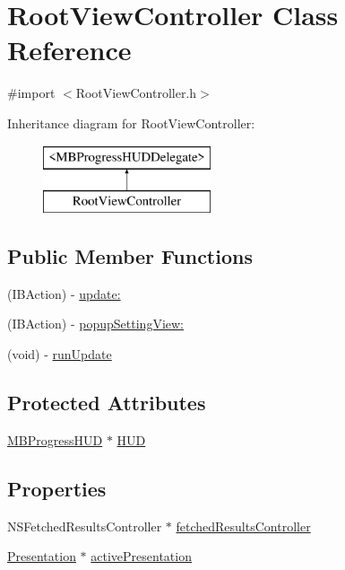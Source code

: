 \hypertarget{interface_root_view_controller}{
\section{RootViewController Class Reference}
\label{interface_root_view_controller}
}


{\ttfamily \#import $<$RootViewController.h$>$}

Inheritance diagram for RootViewController:\begin{figure}[H]
\begin{center}
\leavevmode
\includegraphics[height=2.000000cm]{interface_root_view_controller}
\end{center}
\end{figure}
\subsection*{Public Member Functions}
\begin{DoxyCompactItemize}
\item 
(IBAction) -\/ \hyperlink{interface_root_view_controller_afd9e8d3ca0345010f3372d9dd8d77a08}{update:}
\item 
(IBAction) -\/ \hyperlink{interface_root_view_controller_a1a3e9ecd465f641cfbe7b3e585abd31a}{popupSettingView:}
\item 
(void) -\/ \hyperlink{interface_root_view_controller_a3642c277100c7f3c5a1aa625cf7d9c44}{runUpdate}
\end{DoxyCompactItemize}
\subsection*{Protected Attributes}
\begin{DoxyCompactItemize}
\item 
\hyperlink{interface_m_b_progress_h_u_d}{MBProgressHUD} $\ast$ \hyperlink{interface_root_view_controller_a62209f8d829db91e9c588dee85158379}{HUD}
\end{DoxyCompactItemize}
\subsection*{Properties}
\begin{DoxyCompactItemize}
\item 
NSFetchedResultsController $\ast$ \hyperlink{interface_root_view_controller_a7188ae93e075694ba7b03c301e09f8a2}{fetchedResultsController}
\item 
\hyperlink{interface_presentation}{Presentation} $\ast$ \hyperlink{interface_root_view_controller_ae180d02b7737a300a02c7e8de4426e1d}{activePresentation}
\end{DoxyCompactItemize}


